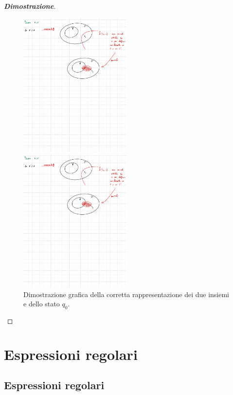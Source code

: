 \documentclass[a4paper]{article}
\begin{document}
\begin{proof}[\textbf{Dimostrazione}]
		\begin{figure}[!htp]
			\centering
			\includegraphics[width=0.5\textwidth]{img/teorema_equivalenza1.pdf}
			\caption{Dimostrazione grafica per evidenziare l'impossibilità della presenza dello stato $q_{0}$ solamente in un insieme.}
			\includegraphics[width=0.5\textwidth]{img/teorema_equivalenza2.pdf}
			\caption{Dimostrazione grafica della corretta rappresentazione dei due insiemi e dello stato $q_{0}$.}\label{dimostrazione:equivalenza insieme}
		\end{figure}
	\end{proof}


	\section{Espressioni regolari}
	
	\subsection{Espressioni regolari}
	
\end{document}
